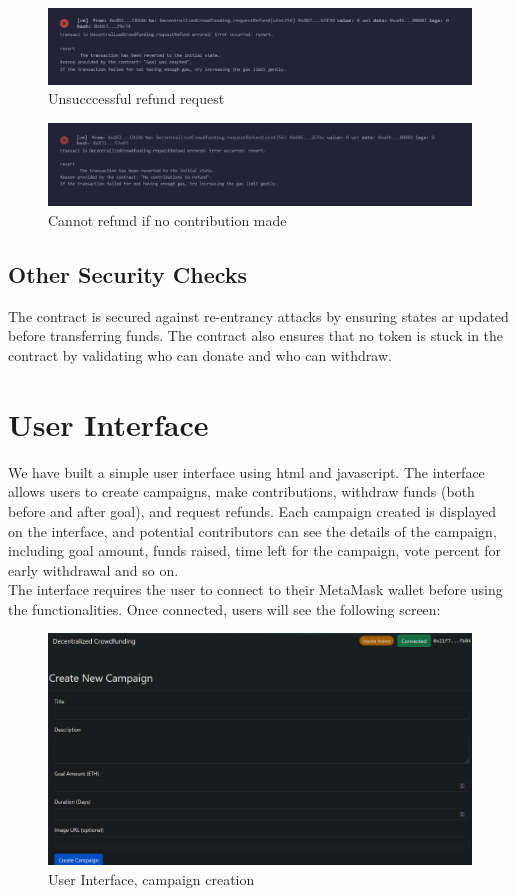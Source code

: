 \documentclass[12pt,reqno]{article}
\begin{document}
\begin{figure}[h!]
    \centering
    \includegraphics[width=0.6\linewidth]{Pictures/refund_req1.png}
    \caption{Unsucccessful refund request}
    \label{refund_failed1}
\end{figure}

\newpage 

\begin{figure}[h!]
    \centering
    \includegraphics[width=0.6\linewidth]{Pictures/refund_req2.png}
    \caption{Cannot refund if no contribution made}
    \label{refund_failed2}
\end{figure}

\subsection{Other Security Checks}
The contract is secured against re-entrancy attacks by ensuring 
states ar updated before transferring funds. The contract also 
ensures that no token is stuck in the contract by validating who 
can donate and who can withdraw. 

\newpage

\section{User Interface}
We have built a simple user interface using html and javascript. 
The interface allows users to create campaigns, make contributions, 
withdraw funds (both before and after goal), and request refunds.  
Each campaign created is displayed on the interface, and potential 
contributors can see the details of the campaign, including 
goal amount, funds raised, time left for the campaign, vote percent 
for early withdrawal and so on. \\ 

The interface requires the user to connect to their MetaMask wallet 
before using the functionalities. Once connected, users will see the 
following screen: \\

\begin{figure}[h!]
    \centering
    \includegraphics[width=0.6\linewidth]{Pictures/ui_1.png}
    \caption{User Interface, campaign creation}
    \label{cam_create}
\end{figure}
\end{document}

